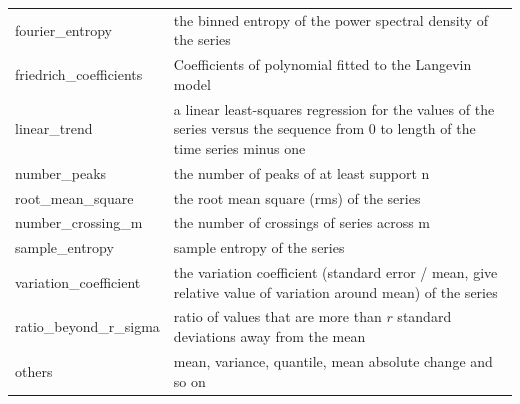 \begin{table}
\begin{tabular}{p{2.25cm} p{12 cm}}
    fourier\_entropy & the binned entropy of the power spectral density of the series \\
    \rowcolor{gray!20} friedrich\_coefficients & Coefficients of polynomial fitted to the Langevin model \\
    linear\_trend & a linear least-squares regression for the values of the series versus the sequence from 0 to length of the time series minus one \\
     \rowcolor{gray!20} number\_peaks & the number of peaks of at least support n \\
    root\_mean\_square & the root mean square (rms) of the series \\
     \rowcolor{gray!20} number\_crossing\_m & the number of crossings of series across m \\
    sample\_entropy & sample entropy of the series \\
     \rowcolor{gray!20} variation\_coefficient & the variation coefficient (standard error / mean, give relative value of variation around mean) of the series \\
    ratio\_beyond\_r\_sigma & ratio of values that are more than $r$ standard deviations away from the mean \\
     \rowcolor{gray!20} others & mean, variance, quantile, mean absolute change and so on \\
    \hline
    \hline
    \end{tabular}
    \label{tbl:feat_list}
\end{table}




